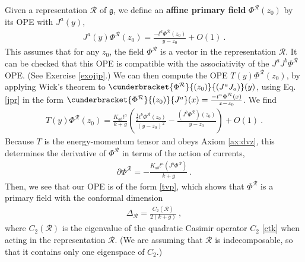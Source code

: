\documentclass[12pt, a4paper, notitlepage, twoside]{report}
\numberwithin{equation}{section}
\theoremstyle{break}
\begin{document}
Given a representation $\mathcal{R}$ of $\mathfrak{g}$, we define an \textbf{\boldmath affine primary field} $\Phi^{\mathcal{R}}(z_0)$ by its OPE with $J^a(y)$,
\begin{align}
 \boxed{ J^a(y) \Phi^{\mathcal{R}}(z_0) = \frac{-t^a\Phi^{\mathcal{R}}(z_0)}{y-z_0} + O(1) } \ .
\label{jpr}
\end{align}
This assumes that for any $z_0$, the field $\Phi^{\mathcal{R}}$ is a vector in the representation $\mathcal{R}$. 
It can be checked that this OPE is compatible with the associativity of the $J^aJ^b\Phi^\mathcal{R}$ OPE. (See Exercise \ref{exojjp}.)
We can then 
compute the OPE $T(y)\Phi^{\mathcal{R}}(z_0)$, by applying Wick's theorem to $\cunderbracket{\Phi^\mathcal{R}}{(z_0)}{(J^aJ_a)}(y)$, using Eq. \eqref{jpr} in the form $\cunderbracket{\Phi^\mathcal{R}}{(z_0)}{J^a}(x) = \frac{-t^a\Phi^\mathcal{R}(x)}{x-z_0}$.
We find 
\begin{align}
 T(y)\Phi^{\mathcal{R}}(z_0) = \frac{K_{ab}t^a}{k+g}\left(\frac{\frac12 t^b\Phi^{\mathcal{R}}(z_0)}{(y-z_0)^2} -\frac{(J^b\Phi^{\mathcal{R}})(z_0)}{y-z_0}\right) + O(1)\ . 
\end{align}
Because $T$ is the energy-momentum tensor and obeys Axiom \ref{ax:dvz}, this determines the derivative of $\Phi^\mathcal{R}$ in terms of the action of currents,
\begin{align}
\partial\Phi^\mathcal{R} = -\frac{K_{ab}t^a(J^b\Phi^\mathcal{R})}{k+g} \ .
\label{lmp}
\end{align}
Then, we see that our OPE is 
of the form \eqref{tvp}, which shows that $\Phi^{\mathcal{R}}$ is a primary field with the conformal dimension
\begin{align}
 \boxed{\Delta_\mathcal{R}  = \frac{C_2(\mathcal{R})}{2(k+g)}}\ ,
\label{dr}
\end{align}
where $C_2(\mathcal{R})$ is the eigenvalue of the quadratic Casimir operator $C_2$ \eqref{ctk} when acting in the representation $\mathcal{R}$. (We are assuming that $\mathcal{R}$ is indecomposable, so that it contains only one eigenspace of $C_2$.) 
\end{document}
